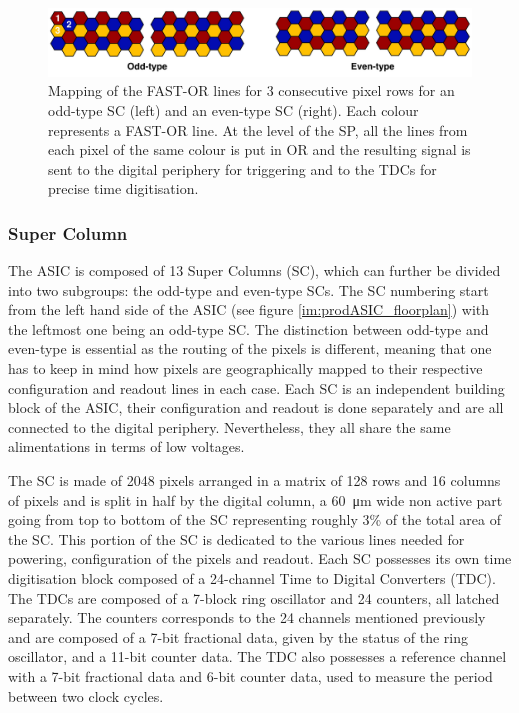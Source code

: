 			\begin{figure}[h]
				\centering
				\includegraphics[width=1.0\textwidth]{files/FastOr_map}
				\caption{Mapping of the FAST-OR lines for 3 consecutive pixel rows for an odd-type SC (left) and an even-type SC (right). Each colour represents a FAST-OR line. At the level of the SP, all the lines from each pixel of the same colour is put in OR and the resulting signal is sent to the digital periphery for triggering and to the TDCs for precise time digitisation.}
				\label{im:FastOR_map}
			\end{figure}
			
			
			\subsubsection{Super Column} 
			The ASIC is composed of 13 Super Columns (SC), which can further be divided into two subgroups: the odd-type and even-type SCs. The SC numbering start from the left hand side of the ASIC (see figure \ref{im:prodASIC_floorplan}) with the leftmost one being an odd-type SC. The distinction between odd-type and even-type is essential as the routing of the pixels is different, meaning that one has to keep in mind how pixels are geographically mapped to their respective configuration and readout lines in each case.  Each SC is an independent building block of the ASIC, their configuration and readout is done separately and are all connected to the digital periphery. Nevertheless, they all share the same alimentations in terms of low voltages. 
				
			The SC is made of 2048 pixels arranged in a matrix of 128 rows and 16 columns of pixels and is split in half by the digital column, a \SI{60}{\micro\meter} wide non active part going from top to bottom of the SC representing roughly 3\% of the total area of the SC. This portion of the SC is dedicated to the various lines needed for powering, configuration of the pixels and readout.
				Each SC possesses its own time digitisation block composed of a 24-channel Time to Digital Converters (TDC). The TDCs are composed of a 7-block ring oscillator and 24 counters, all latched separately. The counters corresponds to the 24 channels mentioned previously and are composed of a 7-bit fractional data, given by the status of the ring oscillator, and a 11-bit counter data. The TDC also possesses a reference channel with a 7-bit fractional data and 6-bit counter data, used to measure the period between two clock cycles. 

